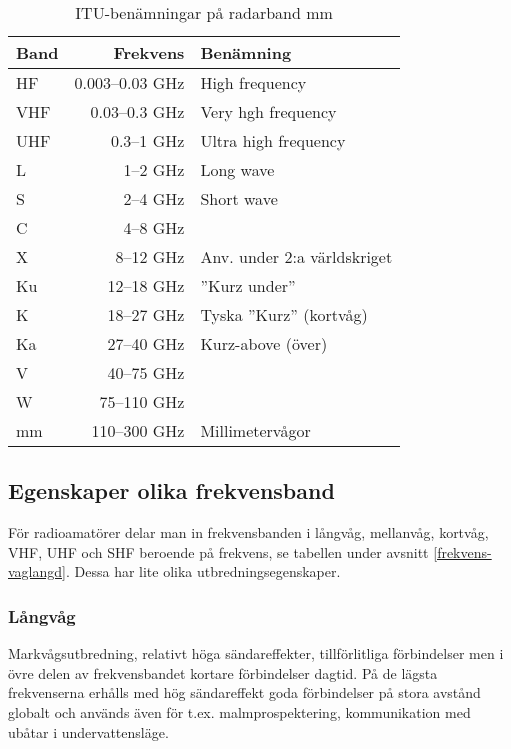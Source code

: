 \begin{table}[H]
\centering

\begin{tabular}{lrl}
	\textbf{Band} & \textbf{Frekvens} & \textbf{Benämning}          \\ \hline
	HF            &   0.003--0.03 GHz & High frequency              \\
	VHF           &     0.03--0.3 GHz & Very hgh frequency          \\
	UHF           &        0.3--1 GHz & Ultra high frequency        \\
	L             &          1--2 GHz & Long wave                   \\
	S             &          2--4 GHz & Short wave                  \\
	C             &          4--8 GHz &  \\
	X             &         8--12 GHz & Anv. under 2:a världskriget \\
	Ku            &        12--18 GHz & ''Kurz under''              \\
	K             &        18--27 GHz & Tyska ''Kurz'' (kortvåg)    \\
	Ka            &        27--40 GHz & Kurz-above (över)           \\
	V             &        40--75 GHz &  \\
	W             &       75--110 GHz &  \\
	mm            &      110--300 GHz & Millimetervågor
\end{tabular}
\caption{ITU-benämningar på radarband mm}
\end{table}

\subsection{Egenskaper olika frekvensband}

För radioamatörer delar man in frekvensbanden i långvåg, mellanvåg, kortvåg, VHF, UHF och SHF beroende på frekvens, se tabellen under avsnitt \ref{frekvens-vaglangd}. Dessa har lite olika utbredningsegenskaper.

\subsubsection{Långvåg}

Markvågsutbredning, relativt höga sändareffekter, tillförlitliga för\-bind\-el\-ser men i övre delen av frekvensbandet kortare förbindelser dagtid. På de lägsta frekvenserna erhålls med hög sändareffekt goda förbindelser på stora avstånd globalt och används även för t.ex. malmprospektering, kommunikation med ubåtar i undervattensläge.

